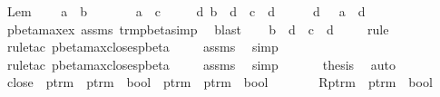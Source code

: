 \begin{isabellebody}
%
\endisatagproof
{\isafoldproof}%
%
\isadelimproof
%
\endisadelimproof
%
\isamarkuptrue%
\isamarkupfalse%
\ Lem{}{\isacharunderscore}{}{\isacharunderscore}{}{\isacharcolon}\ \isanewline
\ \ \ {\isachardoublequoteopen}a\ {\isasymggreater}\ b{\isachardoublequoteclose}\isanewline
\ \ \ \ \ \ \ {\isachardoublequoteopen}a\ {\isasymggreater}\ c{\isachardoublequoteclose}\isanewline
\ \ \ \ \ {\isachardoublequoteopen}{\isasymexists}d{\isachardot}\ b\ {\isasymggreater}\ d\ {\isasymand}\ c\ {\isasymggreater}\ d{\isachardoublequoteclose}\isanewline
%
\isadelimproof
%
\endisadelimproof
%
\isatagproof
{}\isamarkupfalse%
\ {\isacharminus}\isanewline
\ \ \isamarkupfalse%
\ d\ \ {}{\isacharcolon}\ {\isachardoublequoteopen}a\ {\isachargreater}{\isachargreater}{\isachargreater}\ d{\isachardoublequoteclose}\ \isamarkupfalse%
\ pbeta{\isacharunderscore}max{\isacharunderscore}ex\ assms{\isacharparenleft}{}{\isacharparenright}\ trm{\isacharunderscore}pbeta{\isacharunderscore}simp{}\ \isamarkupfalse%
\ blast\isanewline
\ \ \isamarkupfalse%
\ {\isachardoublequoteopen}b\ {\isasymggreater}\ d\ {\isasymand}\ c\ {\isasymggreater}\ d{\isachardoublequoteclose}\ \isanewline
\ \ \isamarkupfalse%
\ rule\ \isanewline
\ \ \isamarkupfalse%
\ {\isacharparenleft}rule{\isacharunderscore}tac\ pbeta{\isacharunderscore}max{\isacharunderscore}closes{\isacharunderscore}pbeta{\isacharparenright}\isanewline
\ \ \isamarkupfalse%
\ {}\ assms\ \isamarkupfalse%
\ simp{\isacharplus}\isanewline
\ \ \isamarkupfalse%
\ {\isacharparenleft}rule{\isacharunderscore}tac\ pbeta{\isacharunderscore}max{\isacharunderscore}closes{\isacharunderscore}pbeta{\isacharparenright}\isanewline
\ \ \isamarkupfalse%
\ {}\ assms\ \isamarkupfalse%
\ simp{\isacharplus}\isanewline
\ \ \isamarkupfalse%
\isanewline
\ \ \isamarkupfalse%
\ {\isacharquery}thesis\ \isamarkupfalse%
\ auto\isanewline
{}\isamarkupfalse%
%
\endisatagproof
{\isafoldproof}%
%
\isadelimproof
%
\endisadelimproof
%
\isamarkuptrue%
\isamarkupfalse%
\ close\ {\isacharcolon}{\isacharcolon}\ {\isachardoublequoteopen}{\isacharparenleft}ptrm\ {\isasymRightarrow}\ ptrm\ {\isasymRightarrow}\ bool{\isacharparenright}\ {\isasymRightarrow}\ ptrm\ {\isasymRightarrow}\ ptrm\ {\isasymRightarrow}\ bool{\isachardoublequoteclose}\ {\isacharparenleft}{\isachardoublequoteopen}{\isacharunderscore}{\isacharasterisk}\ {\isacharunderscore}\ \ {\isacharunderscore}{\isachardoublequoteclose}\ {\isacharbrackleft}{}{}{\isacharcomma}{}{}{\isacharbrackright}\ {}{}{\isacharparenright}\ \ R{\isacharcolon}{\isacharcolon}{\isachardoublequoteopen}ptrm\ {\isasymRightarrow}\ ptrm\ {\isasymRightarrow}\ bool{\isachardoublequoteclose}\isanewline

\end{isabellebody}
